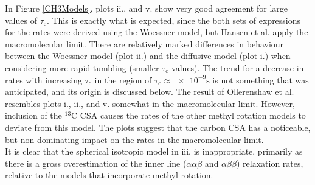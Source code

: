 In Figure \ref{CH3Models}, plots ii., and v. show very good agreement for large values of $\tau_{\text{c}}$. This is exactly what is expected, since the both sets of expressions for the rates were derived using the Woessner model, but Hansen et al. apply the macromolecular limit. There are relatively marked differences in behaviour between the Woessner model (plot ii.) and the diffusive model (plot i.) when considering more rapid tumbling (smaller $\tau_{\text{c}}$ values). The trend for a decrease in rates with increasing $\tau_{\text{c}}$ in the region of $\tau_{\text{c}} \approx \num{e-9} \si{\second}$ is not something that was anticipated, and its origin is discussed below. The result of Ollerenshaw et al. resembles plots i., ii., and v. somewhat in the macromolecular limit. However, inclusion of the $^{13}$C CSA causes the rates of the other methyl rotation models to deviate from this model. The plots suggest that the carbon CSA has a noticeable, but non-dominating impact on the rates in the macromolecular limit.\\
It is clear that the spherical isotropic model in iii. is inappropriate, primarily as there is a gross overestimation of the inner line ($\alpha \alpha \beta$ and $\alpha \beta \beta$) relaxation rates, relative to the models that incorporate methyl rotation.
